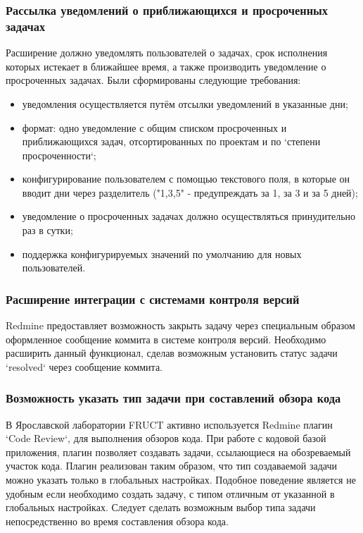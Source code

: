 \subsubsection{Рассылка уведомлений о приближающихся и просроченных задачах}
Расширение должно уведомлять пользователей о задачах, срок исполнения которых
истекает в ближайшее время, а также производить уведомление о просроченных
задачах. Были сформированы следующие требования:
\begin{itemize}
  \item уведомления осуществляется путём отсылки уведомлений в указанные дни;
  \item формат: одно уведомление с общим списком просроченных и приближающихся
  задач, отсортированных по проектам и по `степени просроченности`; 
  \item конфигурирование пользователем с помощью текстового поля, в которые он
  вводит дни через разделитель ("1,3,5" - предупреждать за 1, за 3 и за 5
  дней);
  \item уведомление о просроченных задачах должно осуществляться принудительно
  раз в сутки;
  \item поддержка конфигурируемых значений по умолчанию для новых
  пользователей.
\end{itemize}

\subsubsection{Расширение интеграции с системами контроля версий}
Redmine предоставляет возможность закрыть задачу через специальным образом
оформленное сообщение коммита в системе контроля версий. Необходимо расширить
данный функционал, сделав возможным установить статус задачи `resolved`
через сообщение коммита.

\subsubsection{Возможность указать тип задачи при составлений обзора кода}
В Ярославской лаборатории FRUCT активно используется Redmine плагин `Code
Review`, для выполнения обзоров кода. При работе с кодовой базой приложения,
плагин позволяет создавать задачи, ссылающиеся на обозреваемый участок кода.
Плагин реализован таким образом, что тип создаваемой задачи можно указать
только в глобальных настройках. Подобное поведение является не удобным
если необходимо создать задачу, с типом отличным от указанной в глобальных
настройках. Следует сделать возможным выбор типа задачи непосредственно во
время составления обзора кода.



